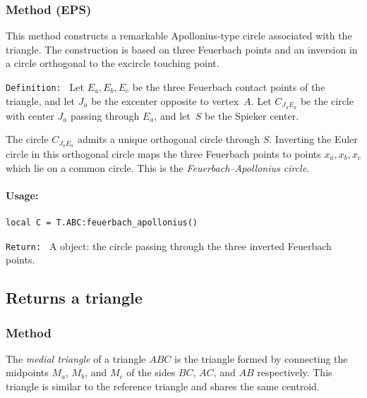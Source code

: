 \subsubsection{Method (EPS)}
\label{ssub:feuerbach_apollonius}

This method constructs a remarkable Apollonius-type circle associated with the
triangle.
The construction is based on three Feuerbach points and an inversion in a
circle orthogonal to the excircle touching point.

\texttt{Definition: }
Let $E_a,E_b,E_c$ be the three Feuerbach contact points of the triangle, and
let $J_a$ be the excenter opposite to vertex~$A$.
Let $C_{J_aE_a}$ be the circle with center $J_a$ passing through $E_a$, and
let~$S$ be the Spieker center.

The circle $C_{J_aE_a}$ admits a unique orthogonal circle through $S$.
Inverting the Euler circle in this orthogonal circle maps the three Feuerbach
points to points $x_a,x_b,x_c$ which lie on a common circle.
This is the \emph{Feuerbach--Apollonius circle}.

\paragraph{Usage: }

\begin{verbatim}
local C = T.ABC:feuerbach_apollonius()
\end{verbatim}

\texttt{Return: }
A  object: the circle passing through the three inverted
Feuerbach points.





\subsection{Returns  a triangle}
\subsubsection{Method } %
\label{ssub:method_triangle_medial}

The \emph{medial triangle} of a triangle $ABC$ is the triangle formed by connecting the midpoints $M_a$, $M_b$, and $M_c$ of the sides $BC$, $AC$, and $AB$ respectively. This triangle is similar to the reference triangle and shares the same centroid.


